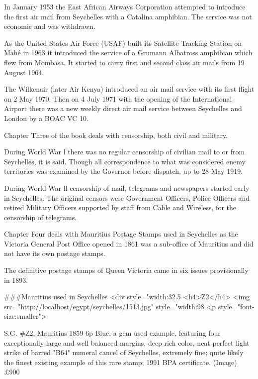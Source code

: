 \documentclass[10pt,oneside,justified]{tufte-book}     %
\def\pound{\pounds}
\begin{document}
In January 1953 the East African Airways Corporation attempted to introduce the first air mail from Seychelles with a Catalina amphibian. The service was not economic and was withdrawn.

As the United States Air Force (USAF) built its Satellite Tracking Station on Mah\'e in 1963 it introduced the service of a Grumann Albatross amphibian which flew from Mombasa. It started to carry first and second class air mails from 19 August 1964.

The Wilkenair (later Air Kenya) introduced an air mail service with its first flight on 2 May 1970. Then on 4 July 1971 with the opening of the International Airport there was a new weekly direct air mail service between Seychelles and London by a BOAC VC 10.

 

Chapter Three of the book deals with censorship, both civil and military.

During World War l there was no regular censorship of civilian mail to or from Seychelles, it is said. Though all correspondence to what was considered enemy territories was examined by the Governor before dispatch, up to 28 May 1919.

 

During World War ll censorship of mail, telegrams and newspapers started early in Seychelles. The original censors were Government Officers, Police Officers and retired Military Officers supported by staff from Cable and Wireless, for the censorship of telegrams.

 

Chapter Four deals with Mauritius Postage Stamps used in Seychelles as the Victoria General Post Office opened in 1861 was a sub-office of Mauritius and did not have its own postage stamps.

The definitive postage stamps of Queen Victoria came in six issues provisionally in 1893.


\#\#\#Mauritius used in Seychelles
<div style="width:32.5%
<h4>Z2</h4>
<img src="http://localhost/egypt/seychelles/1513.jpg" style="width:98%
<p style="font-size:smaller"> 

S.G. \#Z2, Mauritius 1859 6p Blue, a gem used example, featuring four exceptionally large and well balanced 
margins, deep rich color, neat perfect light strike of barred "B64" numeral cancel of Seychelles, 
extremely fine; quite likely the finest existing example of this rare stamp; 1991 BPA certificate. (Image) 	\pound900
\end{document}
